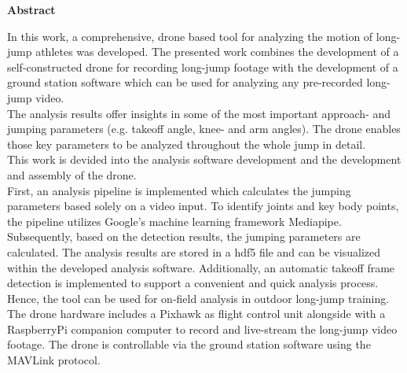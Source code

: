 \thispagestyle{empty}
\vspace*{\fill}
\begin{center}
        \textbf{Abstract}
\end{center}
In this work, a comprehensive, drone based tool for analyzing the
motion of long-jump athletes was developed.
The presented work combines the development of a self-constructed drone for
recording long-jump footage with the development of a ground station software
which can be used for analyzing any pre-recorded long-jump video.\\
The analysis results offer insights in some of the most important approach-
and jumping parameters (e.g. takeoff angle, knee- and arm angles).
The drone enables those key parameters to be analyzed throughout the whole
jump in detail.\\
This work is devided into the analysis software development and the
development and assembly of the drone.\\
First, an analysis pipeline is implemented which calculates the jumping
parameters based solely on a video input.
To identify joints and key body points, the pipeline utilizes Google's
machine learning framework Mediapipe.
Subsequently, based on the detection results, the jumping parameters are
calculated.
The analysis results are stored in a hdf5 file and can be visualized within
the developed analysis software.
Additionally, an automatic takeoff frame detection is implemented to support a
convenient and quick analysis process.
Hence, the tool can be used for on-field analysis in outdoor long-jump
training.\\
The drone hardware includes a Pixhawk as flight control unit alongside with
a RaspberryPi companion computer to record and live-stream the long-jump video
footage.
The drone is controllable via the ground station software using the MAVLink
protocol.\\ 
\vfill


